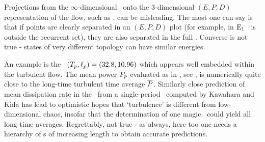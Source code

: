 Projections from the $\infty$-dimensional \statesp\ onto the 3-dimensional
$(E,P,D)$ representation of the flow, such as
, can be misleading.
The most one can say is that if points are clearly separated in an
$(E,P,D)$ plot (for example, in 
$\mathrm{E}_{1}$ \eqv\ is outside the recurrent set), they are also separated
in the full \statesp. Converse is not true - states of
very different topology can have similar energies.

An example is
the \rpo\ $({T_{p}},\ell_p) =(32.8,10.96)$ which appears well embedded
within the turbulent flow. The mean power $\overline{P_p}$ evaluated
as in , see ,
is numerically quite close to the long-time
turbulent time average $\overline{P}$.
Similarly close prediction of mean dissipation rate in the
\pCf\ from a single-period \po\ computed by
Kawahara and Kida has lead to
optimistic hopes that `turbulence' is different from
low-dimensional chaos, insofar that the determination of one
magic
\po\ could yield all long-time averages.
Regrettably, not true - as always, here too one needs a hierarchy
of \po s of increasing length to obtain accurate
predictions.



